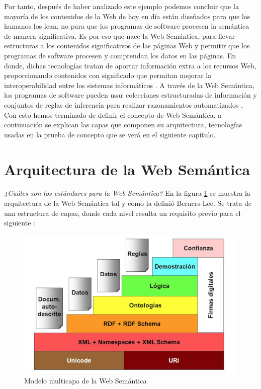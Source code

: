 
Por tanto, después de haber analizado este ejemplo podemos concluir que la mayoría de los contenidos de la Web de hoy en día están diseñados para que los humanos los lean, no para que los programas de software procesen la semántica de manera significativa. Es por eso que nace la Web Semántica, para llevar estructuras a los contenidos significativos de las páginas Web y permitir que los programas de software procesen y comprendan los datos en las páginas. En donde, dichas tecnologías tratan de aportar información extra a los recursos Web, proporcionando contenidos con significado que permitan mejorar la interoperabilidad entre los sistemas informáticos \cite{aplicacion}. A través de la Web Semántica, los programas de software pueden usar colecciones estructuradas de información y conjuntos de reglas de inferencia para realizar razonamientos automatizados \cite{libro-gis}. \\

Con esto hemos terminado de definir el concepto de Web Semántica, a continuación se explican las capas que componen su arquitectura, tecnologías usadas en la prueba de concepto que se verá en el siguiente capítulo.



\section{Arquitectura de la Web Semántica}


\textit{¿Cuáles son los estándares para la Web Semántica?} En la figura \ref{fig:arquitectura1} se muestra la arquitectura de la Web Semántica tal y como la definió Berners-Lee. Se trata de una estructura de capas, donde cada nivel resulta un requisito previo para el siguiente \cite{researchgate}:

\begin{figure}[H]
	\centering
	\includegraphics[width=0.65\linewidth]{imagenes/capitulo3/arquitectura1} 
	\caption{Modelo multicapa de la Web Semántica \cite{researchgate}}
	\label{fig:arquitectura1}
\end{figure}


